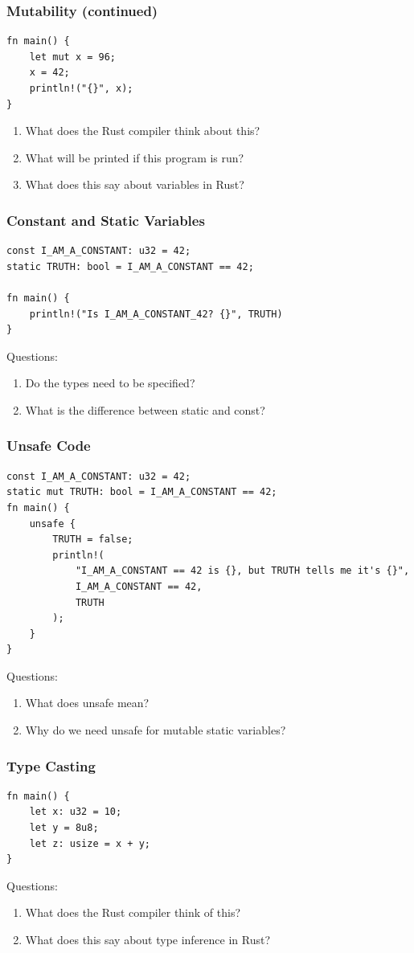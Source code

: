 \documentclass{slides}
\begin{document}
\begin{frame}[fragile]
\frametitle{Mutability (continued)}
\begin{verbatim}
fn main() {
    let mut x = 96;
    x = 42;
    println!("{}", x);
}
\end{verbatim}
\begin{enumerate}
    \item What does the Rust compiler think about this?
    \item What will be printed if this program is run?
    \item What does this say about variables in Rust?
\end{enumerate}
\end{frame}

\begin{frame}[fragile]
\frametitle{Constant and Static Variables}
\begin{verbatim}
const I_AM_A_CONSTANT: u32 = 42;
static TRUTH: bool = I_AM_A_CONSTANT == 42;

fn main() {
    println!("Is I_AM_A_CONSTANT_42? {}", TRUTH)
}
\end{verbatim}
Questions:
\begin{enumerate}
    \item Do the types need to be specified?
    \item What is the difference between static and const?
\end{enumerate}
\end{frame}

\begin{frame}[fragile]
\frametitle{Unsafe Code}
\begin{verbatim}
const I_AM_A_CONSTANT: u32 = 42;
static mut TRUTH: bool = I_AM_A_CONSTANT == 42;
fn main() {
    unsafe {
        TRUTH = false;
        println!(
            "I_AM_A_CONSTANT == 42 is {}, but TRUTH tells me it's {}",
            I_AM_A_CONSTANT == 42,
            TRUTH
        );
    }
}
\end{verbatim}
Questions:
\begin{enumerate}
    \item What does unsafe mean?
    \item Why do we need unsafe for mutable static variables?
\end{enumerate}
\end{frame}

\begin{frame}[fragile]
\frametitle{Type Casting}
\begin{verbatim}
fn main() {
    let x: u32 = 10;
    let y = 8u8;
    let z: usize = x + y;
}
\end{verbatim}
Questions:
\begin{enumerate}
    \item What does the Rust compiler think of this?
    \item What does this say about type inference in Rust?
\end{enumerate}
\end{frame}
\end{document}
